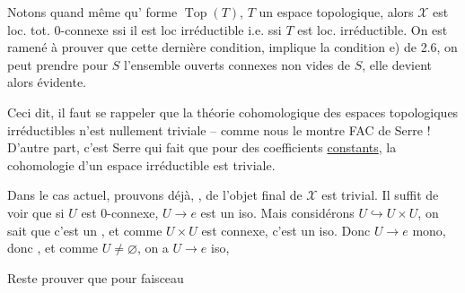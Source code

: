 
 Notons quand même qu'  forme $\operatorname{Top}(T)$, $T$ un espace topologique, alors $\mathscr X$ est loc. tot. $0$-connexe ssi il est loc irréductible i.e. ssi $T$ est loc. irréductible. On est ramené à prouver que cette dernière condition, implique  la condition e) de 2.6,  on peut prendre pour $S$ l'ensemble  ouverts connexes non vides de $S$, elle devient alors évidente.

Ceci dit, il faut se rappeler que la théorie cohomologique des espaces topologiques irréductibles n'est nullement triviale -- comme nous le montre FAC de Serre ! D'autre part, c'est Serre qui  fait  que pour des coefficients \uline{constants}, la cohomologie d'un espace irréductible est triviale.

Dans le cas actuel, prouvons déjà,  ,    de  l'objet final de $\mathscr X$ est trivial. Il suffit de voir que si $U$ est $0$-connexe,  $U\longrightarrow e$ est un iso.  Mais considérons $U\hookrightarrow U\times U$, on sait que c'est un  , et comme $U\times U$ est connexe, c'est un iso. Donc $U\longrightarrow e$ mono,  donc  , et comme $U\ne\varnothing$, on a $U\longrightarrow e$ iso,

Reste  prouver que pour  faisceau

